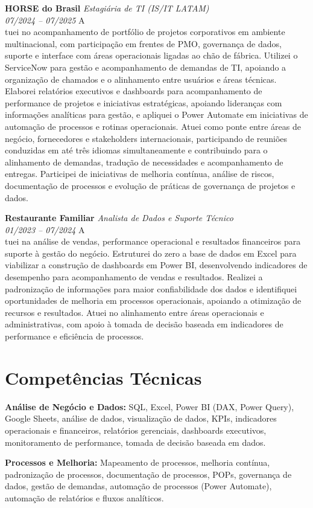 \documentclass[11pt,a4paper]{article}
\newcommand{\cvrole}[4]{%
  \textbf{#1} \hfill \textit{#2}\\%
  \textcolor{subgray}{\textit{#3}} \hfill \textcolor{subgray}{#4}\\[4pt]%
}
\begin{document}
\cvrole{HORSE do Brasil}{Estagiária de TI (IS/IT LATAM)}{07/2024 -- 07/2025}

Atuei no acompanhamento de portfólio de projetos corporativos em ambiente multinacional, com participação em frentes de PMO, governança de dados, suporte e interface com áreas operacionais ligadas ao chão de fábrica. Utilizei o ServiceNow para gestão e acompanhamento de demandas de TI, apoiando a organização de chamados e o alinhamento entre usuários e áreas técnicas. Elaborei relatórios executivos e dashboards para acompanhamento de performance de projetos e iniciativas estratégicas, apoiando lideranças com informações analíticas para gestão, e apliquei o Power Automate em iniciativas de automação de processos e rotinas operacionais. Atuei como ponte entre áreas de negócio, fornecedores e stakeholders internacionais, participando de reuniões conduzidas em até três idiomas simultaneamente e contribuindo para o alinhamento de demandas, tradução de necessidades e acompanhamento de entregas. Participei de iniciativas de melhoria contínua, análise de riscos, documentação de processos e evolução de práticas de governança de projetos e dados.

\cvrole{Restaurante Familiar}{Analista de Dados e Suporte Técnico}{01/2023 -- 07/2024}

Atuei na análise de vendas, performance operacional e resultados financeiros para suporte à gestão do negócio. Estruturei do zero a base de dados em Excel para viabilizar a construção de dashboards em Power BI, desenvolvendo indicadores de desempenho para acompanhamento de vendas e resultados. Realizei a padronização de informações para maior confiabilidade dos dados e identifiquei oportunidades de melhoria em processos operacionais, apoiando a otimização de recursos e resultados. Atuei no alinhamento entre áreas operacionais e administrativas, com apoio à tomada de decisão baseada em indicadores de performance e eficiência de processos.

\section{Competências Técnicas}

\textbf{Análise de Negócio e Dados:} SQL, Excel, Power BI (DAX, Power Query), Google Sheets, análise de dados, visualização de dados, KPIs, indicadores operacionais e financeiros, relatórios gerenciais, dashboards executivos, monitoramento de performance, tomada de decisão baseada em dados.

\textbf{Processos e Melhoria:} Mapeamento de processos, melhoria contínua, padronização de processos, documentação de processos, POPs, governança de dados, gestão de demandas, automação de processos (Power Automate), automação de relatórios e fluxos analíticos.
\end{document}

